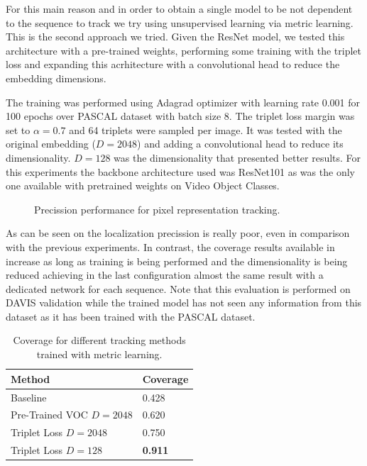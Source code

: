 For this main reason and in order to obtain a single model to be not dependent to the sequence to track we try using unsupervised learning via metric learning. This is the second approach we tried.
Given the ResNet model, we tested this architecture with a pre-trained weights, performing some training with the triplet loss and expanding this acrhitecture with a convolutional head to reduce the embedding dimensions.

The training was performed using Adagrad optimizer with learning rate 0.001 for 100 epochs over PASCAL dataset with batch size 8. The triplet loss margin was set to $\alpha = 0.7$ and 64 triplets were sampled per image.
It was tested with the original embedding ($D=2048$) and adding a convolutional head to reduce its dimensionality.
$D=128$ was the dimensionality that presented better results. For this experiments the backbone architecture used was ResNet101 as was the only one available with pretrained weights on Video Object Classes.


\begin{figure}[h]
  \centering
  
  \caption{Precission performance for pixel representation tracking.}
  \label{fig:tracking_metric_learning}
\end{figure}

As can be seen on  the localization precission is really poor, even in comparison with the previous experiments.
In contrast, the coverage results available in  increase as long as training is being performed and the dimensionality is being reduced achieving in the last configuration almost the same result with a dedicated network for each sequence.
Note that this evaluation is performed on DAVIS validation while the trained model has not seen any information from this dataset as it has been trained with the PASCAL dataset.


\begin{table}[h]
  \centering
  \begin{tabular}{l|l}
    \toprule
    Method                   & Coverage       \\
    \midrule
    Baseline                 & 0.428          \\
    Pre-Trained VOC $D=2048$ & 0.620          \\
    Triplet Loss $D=2048$    & 0.750          \\
    Triplet Loss $D=128$     & \textbf{0.911} \\
    \bottomrule
  \end{tabular}
  \caption{Coverage for different tracking methods trained with metric learning. }
  \label{tab:coverage_tracking_metric_learning}
\end{table}

